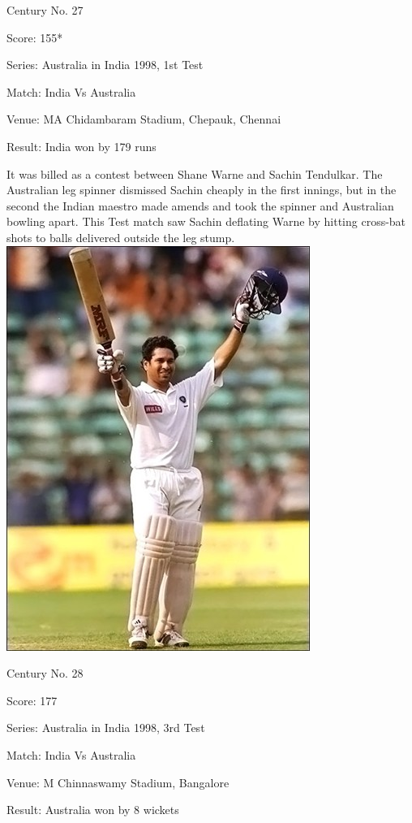 \documentclass[11pt, a4paper]{article}
\begin{document}
Century No. 27

Score: 155*

Series: Australia in India 1998, 1st Test

Match: India Vs Australia

Venue: MA Chidambaram Stadium, Chepauk, Chennai

Result: India won by 179 runs

It was billed as a contest between Shane Warne and Sachin Tendulkar. The Australian leg spinner dismissed Sachin cheaply in the first innings, but in the second the Indian maestro made amends and took the spinner and Australian bowling apart. This Test match saw Sachin deflating Warne by hitting cross-bat shots to balls delivered outside the leg stump.
\newpage
\includegraphics[height=0.8\textheight]{pics/28.jpg}

Century No. 28

Score: 177

Series: Australia in India 1998, 3rd Test

Match: India Vs Australia

Venue: M Chinnaswamy Stadium, Bangalore

Result: Australia won by 8 wickets
\end{document}
